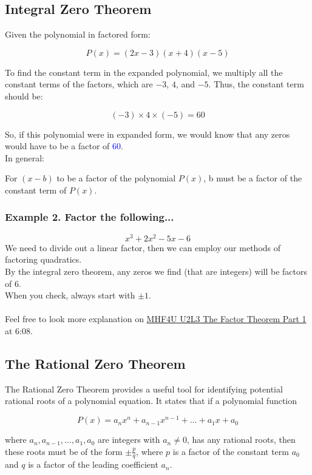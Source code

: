 \documentclass{article}
\begin{document}
\subsection*{Integral Zero Theorem}

Given the polynomial in factored form:

\[ P(x) = (2x - 3)(x + 4)(x - 5) \]

To find the constant term in the expanded polynomial, we multiply all the constant terms of the factors, which are \( -3 \), \( 4 \), and \( -5 \). Thus, the constant term should be:

\[ (-3) \times 4 \times (-5) = 60 \]

So, if this polynomial were in expanded form, we would know that any zeros would have to be a factor of \textcolor{blue}{60}. \\

In general:
\begin{tcolorbox}[colback=red!5!white,colframe=red!75!black]
For $(x-b)$  to be a factor of the polynomial $P(x)$, b must be
a factor of the constant term of $P(x)$.
\end{tcolorbox}

\subsubsection*{Example 2. Factor the following...}
$$x^3 + 2x^2 -5x - 6$$
We need to divide out a linear factor, then we can employ our
methods of factoring quadratics. \\
By the integral zero theorem, any zeros we find (that are integers)
will be factors of 6. \\
When you check, always start with $\pm 1$.\\\\
Feel free to look more explanation on \href{https://www.youtube.com/watch?v=7Hny2n6t83Y}{MHF4U U2L3 The Factor Theorem Part 1} at 6:08.

\subsection*{The Rational Zero Theorem}
The Rational Zero Theorem provides a useful tool for identifying potential rational roots of a polynomial equation. It states that if a polynomial function

\[ P(x) = a_nx^n + a_{n-1}x^{n-1} + \ldots + a_1x + a_0 \]

where \( a_n, a_{n-1}, \ldots, a_1, a_0 \) are integers with \( a_n \neq 0 \), has any rational roots, then these roots must be of the form \( \pm \frac{p}{q} \), where \( p \) is a factor of the constant term \( a_0 \) and \( q \) is a factor of the leading coefficient \( a_n \).
\end{document}
